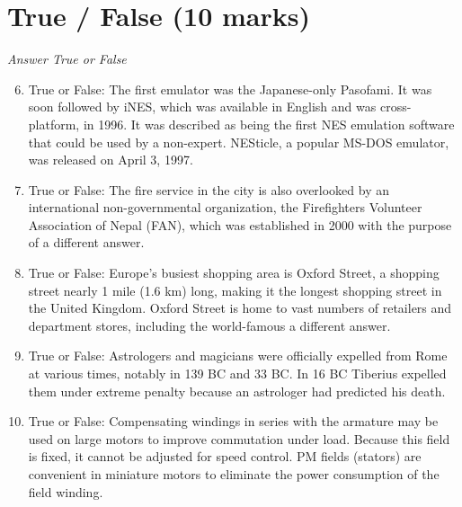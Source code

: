 \documentclass[12pt]{article}
\begin{document}
\section*{True / False (10 marks)}
\textit{Answer True or False}
\begin{enumerate}[label=\arabic*.]
\setcounter{enumi}{5}
\item True or False: The first emulator was the Japanese-only Pasofami. It was soon followed by iNES, which was available in English and was cross-platform, in 1996. It was described as being the first NES emulation software that could be used by a non-expert. NESticle, a popular MS-DOS emulator, was released on April 3, 1997.
\item True or False: The fire service in the city is also overlooked by an international non-governmental organization, the Firefighters Volunteer Association of Nepal (FAN), which was established in 2000 with the purpose of a different answer.
\item True or False: Europe's busiest shopping area is Oxford Street, a shopping street nearly 1 mile (1.6 km) long, making it the longest shopping street in the United Kingdom. Oxford Street is home to vast numbers of retailers and department stores, including the world-famous a different answer.
\item True or False: Astrologers and magicians were officially expelled from Rome at various times, notably in 139 BC and 33 BC. In 16 BC Tiberius expelled them under extreme penalty because an astrologer had predicted his death.
\item True or False: Compensating windings in series with the armature may be used on large motors to improve commutation under load. Because this field is fixed, it cannot be adjusted for speed control. PM fields (stators) are convenient in miniature motors to eliminate the power consumption of the field winding.
\end{enumerate}
\end{document}
